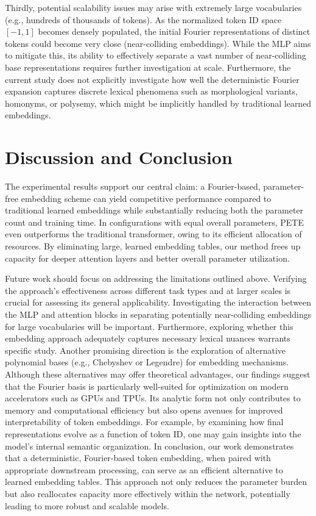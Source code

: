 \documentclass{article}
\begin{document}
Thirdly, potential scalability issues may arise with extremely large vocabularies (e.g., hundreds of thousands of tokens). As the normalized token ID space \([-1, 1]\) becomes densely populated, the initial Fourier representations of distinct tokens could become very close (near-colliding embeddings). While the MLP aims to mitigate this, its ability to effectively separate a vast number of near-colliding base representations requires further investigation at scale. Furthermore, the current study does not explicitly investigate how well the deterministic Fourier expansion captures discrete lexical phenomena such as morphological variants, homonyms, or polysemy, which might be implicitly handled by traditional learned embeddings.
\section{Discussion and Conclusion}
The experimental results support our central claim: a Fourier-based, parameter-free embedding scheme can yield competitive performance compared to traditional learned embeddings while substantially reducing both the parameter count and training time. In configurations with equal overall parameters, PETE even outperforms the traditional transformer, owing to its efficient allocation of resources. By eliminating large, learned embedding tables, our method frees up capacity for deeper attention layers and better overall parameter utilization.

Future work should focus on addressing the limitations outlined above. Verifying the approach's effectiveness across different task types and at larger scales is crucial for assessing its general applicability. Investigating the interaction between the MLP and attention blocks in separating potentially near-colliding embeddings for large vocabularies will be important. Furthermore, exploring whether this embedding approach adequately captures necessary lexical nuances warrants specific study. Another promising direction is the exploration of alternative polynomial bases (e.g., Chebyshev or Legendre) for embedding mechanisms. Although these alternatives may offer theoretical advantages, our findings suggest that the Fourier basis is particularly well-suited for optimization on modern accelerators such as GPUs and TPUs. Its analytic form not only contributes to memory and computational efficiency but also opens avenues for improved interpretability of token embeddings. For example, by examining how final representations evolve as a function of token ID, one may gain insights into the model's internal semantic organization.
In conclusion, our work demonstrates that a deterministic, Fourier-based token embedding, when paired with appropriate downstream processing, can serve as an efficient alternative to learned embedding tables. This approach not only reduces the parameter burden but also reallocates capacity more effectively within the network, potentially leading to more robust and scalable models.

\end{document}
